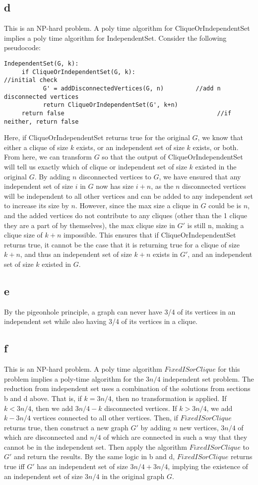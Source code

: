 \documentclass[letterpaper,notitlepage,twoside]{article}
\begin{document}
\subsection*{d}
This is an NP-hard problem. A poly time algorithm for CliqueOrIndependentSet implies a poly time algorithm for IndependentSet. Consider the following pseudocode:
\begin{verbatim}
IndependentSet(G, k):
     if CliqueOrIndependentSet(G, k):                            //initial check
           G' = addDisconnectedVertices(G, n)         //add n disconnected vertices
           return CliqueOrIndependentSet(G', k+n)
     return false                                           //if neither, return false
\end{verbatim}
Here, if CliqueOrIndependentSet returns true for the original $G$, we know that either a clique of size $k$ exists, or an independent set of size $k$ exists, or both. From here, we can transform $G$ so that the output of CliqueOrIndependentSet will tell us exactly which of clique or independent set of size $k$ existed in the original $G$. By adding $n$ disconnected vertices to $G$, we have ensured that any independent set of size $i$ in $G$ now has size $i + n$, as the $n$ disconnected vertices will be independent to all other vertices and can be added to any independent set to increase its size by $n$. However, since the max size a clique in $G$ could be is $n$, and the added vertices do not contribute to any cliques (other than the 1 clique they are a part of by themselves), the max clique size in $G'$ is still n, making a clique size of $k+n$ impossible. This ensures that if CliqueOrIndependentSet returns true, it cannot be the case that it is returning true for a clique of size $k+n$, and thus an independent set of size $k+n$ exists in $G'$, and an independent set of size $k$ existed in $G$. 
\subsection*{e}
By the pigeonhole principle, a graph can never have 3/4 of its vertices in an independent set while also having 3/4 of its vertices in a clique.
\subsection*{f}
This is an NP-hard problem. A poly time algorithm $FixedISorClique$ for this problem implies a poly-time algorithm for the $3n/4$ independent set problem. The reduction from independent set uses a combination of the solutions from sections b and d above. That is, if $k = 3n/4$, then no transformation is applied. If $k < 3n/4$, then we add $3n/4 - k$ disconnected vertices. If $k > 3n/4$, we add $k-3n/4$ vertices connected to all other vertices. Then, if $FixedISorClique$ returns true, then construct a new graph $G'$ by adding $n$ new vertices, $3n/4$ of which are disconnected and $n/4$ of which are connected in such a way that they cannot be in the independent set. Then apply the algorithm $FixedISorClique$ to $G'$ and return the results. By the same logic in b and d, $FixedISorClique$ returns true iff $G'$ has an independent set of size $3n/4 + 3n/4$, implying the existence of an independent set of size $3n/4$ in the original graph $G$.
\end{document}

